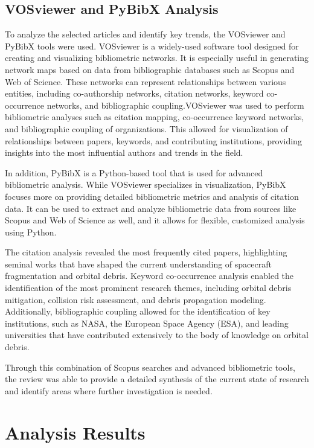 \documentclass[journal ]{new-aiaa}
\begin{document}
\subsection{VOSviewer and PyBibX Analysis}
To analyze the selected articles and identify key trends, the VOSviewer and PyBibX tools were used. VOSviewer is a widely-used software tool designed for creating and visualizing bibliometric networks. It is especially useful in generating network maps based on data from bibliographic databases such as Scopus and Web of Science. These networks can represent relationships between various entities, including co-authorship networks, citation networks, keyword co-occurrence networks, and bibliographic coupling.VOSviewer was used to perform bibliometric analyses such as citation mapping, co-occurrence keyword networks, and bibliographic coupling of organizations. This allowed for visualization of relationships between papers, keywords, and contributing institutions, providing insights into the most influential authors and trends in the field.

In addition, PyBibX is a Python-based tool that is used for advanced bibliometric analysis. While VOSviewer specializes in visualization, PyBibX focuses more on providing detailed bibliometric metrics and analysis of citation data. It can be used to extract and analyze bibliometric data from sources like Scopus and Web of Science as well, and it allows for flexible, customized analysis using Python.

The citation analysis revealed the most frequently cited papers, highlighting seminal works that have shaped the current understanding of spacecraft fragmentation and orbital debris. Keyword co-occurrence analysis enabled the identification of the most prominent research themes, including orbital debris mitigation, collision risk assessment, and debris propagation modeling. Additionally, bibliographic coupling allowed for the identification of key institutions, such as NASA, the European Space Agency (ESA), and leading universities that have contributed extensively to the body of knowledge on orbital debris.

Through this combination of Scopus searches and advanced bibliometric tools, the review was able to provide a detailed synthesis of the current state of research and identify areas where further investigation is needed.

\section{Analysis Results}
\end{document}
